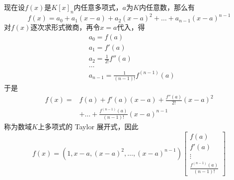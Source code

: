 \documentclass[11pt]{article}
\begin{document}
现在设\(f(x)\)是\(K[x]_n\)内任意多项式，\(a\)为\(K\)内任意数，那么有
\begin{equation*}
f(x)=a_0+a_1(x-a)+a_2(x-a)^2+\dots+a_{n-1}(x-a)^{n-1}
\end{equation*}
对\(f(x)\)逐次求形式微商，再令\(x=a\)代入，得
\begin{align*}
&a_0=f(a)\\
&a_1=f'(a)\\
&a_2=\frac{1}{2!}f''(a)\\
&\dots\\
&a_{n-1}=\frac{1}{(n-1)!}f^{(n-1)}(a)
\end{align*}
于是
\begin{align*}
f(x)=&f(a)+f'(a)(x-a)+\frac{f''(a)}{2!}(x-a)^2\\
&+\dots+\frac{f^{(n-1)}(a)}{(n-1)!}(x-a)^{n-1}
\end{align*}
称为数域\(K\)上多项式的 Taylor 展开式，因此
\begin{equation*}
f(x)=(1,x-a,(x-a)^2,\dots,(x-a)^{n-1})
\begin{bmatrix}
f(a)\\f'(a)\\\vdots\\\frac{f^{(n-1)}(a)}{(n-1)!}
\end{bmatrix}
\end{equation*}
\end{document}
